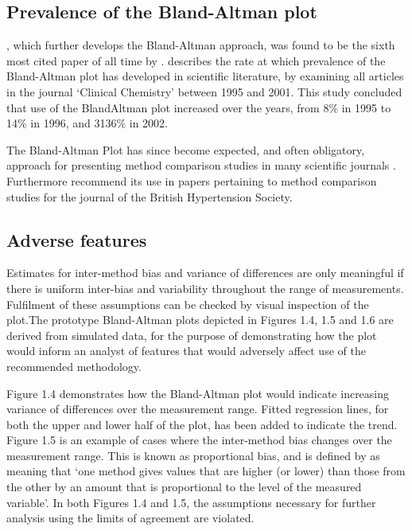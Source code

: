 \documentclass[Main.tex]{subfiles}
\begin{document}

	
\subsection{Prevalence of the Bland-Altman plot}
\citet*{BA86}, which further develops the Bland-Altman approach, was found to be the sixth most cited paper of all time by \citet{BAcite}. \cite{Dewitte} describes the rate at which	prevalence of the Bland-Altman plot has developed in scientific literature, by examining all articles in the journal `Clinical Chemistry' between 1995 and 2001. This study concluded that use of the BlandAltman plot increased over the years, from 8\% in 1995 to 14\% in 1996, and 3136\% in 2002.
	
The Bland-Altman Plot has since become expected, and often obligatory, approach for presenting method comparison studies in many scientific journals \citep{hollis}. Furthermore	\citet{BritHypSoc} recommend its use in papers pertaining to method comparison studies for the journal of the British Hypertension Society.


\newpage	\subsection{Adverse features}
	
	Estimates for inter-method bias and variance of differences are only meaningful if there is uniform inter-bias and variability throughout the range of measurements. Fulfilment of these assumptions can be checked by visual inspection of the plot.The prototype Bland-Altman plots depicted in Figures 1.4, 1.5 and 1.6 are derived from simulated data, for the purpose of demonstrating how the plot would inform an analyst of features that would adversely affect use of the recommended methodology.
	
	Figure 1.4 demonstrates how the Bland-Altman plot would indicate
	increasing variance of differences over the measurement range.
	Fitted regression lines, for both the upper and lower half of the
	plot, has been added to indicate the trend. Figure 1.5 is an
	example of cases where the inter-method bias changes over the measurement range. This is known as proportional bias, and is
	defined by \citet{ludbrook97} as meaning that `one method gives
	values that are higher (or lower) than those from the other by an
	amount that is proportional to the level of the measured
	variable'. In both Figures 1.4 and 1.5, the assumptions necessary
	for further analysis using the limits of agreement are violated.
	
\end{document}
